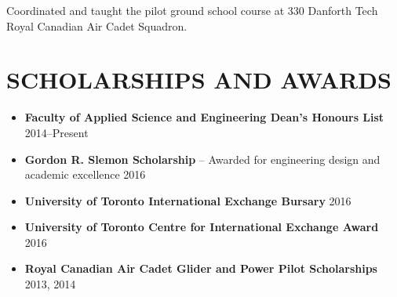 \documentclass{ResumeTemplate}
\begin{document}
	\workitemsone
	{Coordinated and taught the pilot ground school course at 330 Danforth Tech Royal Canadian Air Cadet Squadron.}
	
	\section{SCHOLARSHIPS AND AWARDS}	
	\begin{itemize}[noitemsep, leftmargin=*]
		\item \textbf{Faculty of Applied Science and Engineering Dean's Honours List} \hfill 2014--Present
		\item \textbf{Gordon R. Slemon Scholarship} -- Awarded for engineering design and academic excellence \hfill 2016
		\item \textbf{University of Toronto International Exchange Bursary} \hfill 2016
		\item \textbf{University of Toronto Centre for International Exchange Award} \hfill 2016
		\item \textbf{Royal Canadian Air Cadet Glider and Power Pilot Scholarships} \hfill 2013, 2014\vspace*{-\baselineskip}
	\end{itemize}
\end{document}
